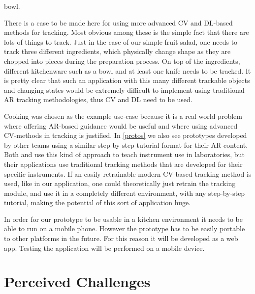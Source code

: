 bowl.\par
	There is a case to be made here for using more advanced CV and 
DL-based methods for tracking. Most obvious among these is the simple fact 
that there are lots of things to track. Just in the case of our simple fruit 
salad, one needs to track three different ingredients, which physically change 
shape as they are chopped into pieces during the preparation process. On top 
of the ingredients, different kitchenware such as a bowl and at least one knife
needs to be tracked. It is pretty clear that such an application with this 
many different trackable objects and changing states would be extremely 
difficult to implement using traditional AR tracking methodologies, thus CV 
and DL need to be used. \par
	Cooking was chosen as the example use-case because it is a real world 
problem where offering AR-based guidance would be useful and where using 
advanced CV-methods in tracking is justified. In \ref{protos} we also see 
prototypes developed by other teams using a similar step-by-step tutorial 
format for their AR-content. Both \textcite{pylvanainen} and 
\textcite{reyesEtAl2016} use this kind of approach to teach instrument use in 
laboratories, but their applications use traditional tracking methods that 
are developed for their specific instruments. If an easily retrainable modern 
CV-based tracking method is used, like in our application, one could 
theoretically just retrain the tracking module, and use it in a completely 
different environment, with any step-by-step tutorial, making the potential of 
this sort of application huge. \par
	In order for our prototype to be usable in a kitchen environment it 
needs to be able to run on a mobile phone. However the prototype has to be 
easily portable to other platforms in the future. 
For this reason it will be developed as a web app. Testing the application 
will be performed on a mobile device.

\section{Perceived Challenges} \label{challenges}

